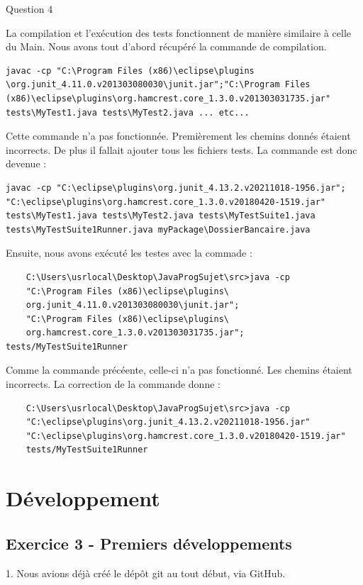 \documentclass{article}
\begin{document}
\newline
Question 4
\newline

La compilation et l'exécution des tests fonctionnent de manière similaire à celle du Main.
Nous avons tout d'abord récupéré la commande de compilation.

	
\begin{lstlisting}
javac -cp "C:\Program Files (x86)\eclipse\plugins
\org.junit_4.11.0.v201303080030\junit.jar";"C:\Program Files 
(x86)\eclipse\plugins\org.hamcrest.core_1.3.0.v201303031735.jar" 
tests\MyTest1.java tests\MyTest2.java ... etc...
\end{lstlisting}
Cette commande n'a pas fonctionnée.
Premièrement les chemins donnés étaient incorrects. De plus il fallait ajouter tous les fichiers tests.
La commande est donc devenue :
\begin{lstlisting}
javac -cp "C:\eclipse\plugins\org.junit_4.13.2.v20211018-1956.jar";
"C:\eclipse\plugins\org.hamcrest.core_1.3.0.v20180420-1519.jar" 
tests\MyTest1.java tests\MyTest2.java tests\MyTestSuite1.java 
tests\MyTestSuite1Runner.java myPackage\DossierBancaire.java
\end{lstlisting}

Ensuite, nous avons exécuté les testes avec la commade :
\begin{lstlisting}
    C:\Users\usrlocal\Desktop\JavaProgSujet\src>java -cp 
    "C:\Program Files (x86)\eclipse\plugins\
    org.junit_4.11.0.v201303080030\junit.jar";
    "C:\Program Files (x86)\eclipse\plugins\
    org.hamcrest.core_1.3.0.v201303031735.jar"; tests/MyTestSuite1Runner
\end{lstlisting}

Comme la commande précéente, celle-ci n'a pas fonctionné. Les chemins étaient incorrects. La correction de la commande donne :

\begin{lstlisting}
    C:\Users\usrlocal\Desktop\JavaProgSujet\src>java -cp 
    "C:\eclipse\plugins\org.junit_4.13.2.v20211018-1956.jar"
    "C:\eclipse\plugins\org.hamcrest.core_1.3.0.v20180420-1519.jar"
    tests/MyTestSuite1Runner
\end{lstlisting}
\newpage
\section{Développement}

\subsection{Exercice 3 - Premiers développements}
1. Nous avions déjà créé le dépôt git au tout début, via GitHub.
\end{document}

